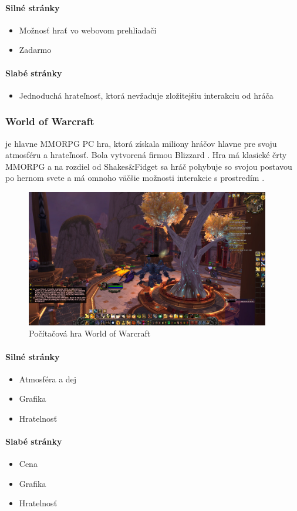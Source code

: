 \paragraph*{Silné stránky}
\begin{itemize}
  \item Možnosť hrať vo webovom prehliadači
  \item Zadarmo   
\end{itemize}
\paragraph*{Slabé stránky}
\begin{itemize}
  \item Jednoduchá hrateľnosť, ktorá nevžaduje zložitejšiu interakciu od hráča
\end{itemize}




\subsubsection{World of Warcraft} je hlavne MMORPG PC hra, ktorá získala miliony hráčov hlavne pre svoju atmosféru a hrateľnosť. Bola vytvorená firmou Blizzard \cite{wow-blizard}. Hra má klasické črty MMORPG a na rozdiel od Shakes\&Fidget sa hráč pohybuje so svojou postavou po hernom svete a má omnoho väčšie možnosti interakcie s prostredím \cite{wow-blizard-guide}.
\begin{figure}[]
  \centering
  \includegraphics[height=6cm]{mainmatter/imgs/wow.jpg}
  \caption{Počítačová hra World of Warcraft}
  \label{fig:comenius}
\end{figure}

\paragraph*{Silné stránky}
\begin{itemize}
  \item Atmosféra a dej
  \item Grafika 
  \item Hratelnosť 
\end{itemize}
\paragraph*{Slabé stránky}
\begin{itemize}
  \item Cena
  \item Grafika 
  \item Hratelnosť 
\end{itemize}